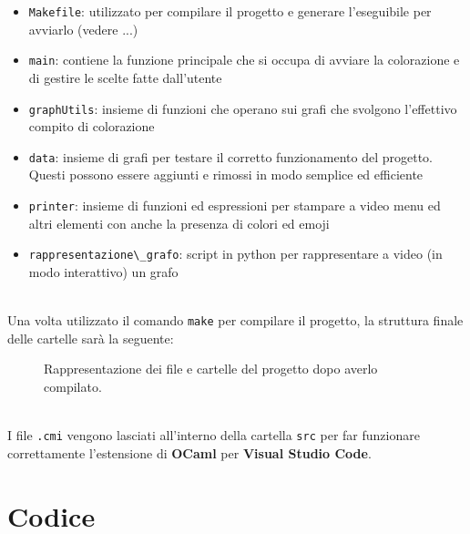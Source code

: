 \begin{itemize}
	\item \lstinline[style=cmd]|Makefile|: utilizzato per compilare il progetto e generare l'eseguibile per avviarlo (vedere ...)	%
	\item \lstinline[style=cmd]|main|: contiene la funzione principale che si occupa di avviare la colorazione e di gestire le scelte fatte dall'utente
	\item \lstinline[style=cmd]|graphUtils|: insieme di funzioni che operano sui grafi che svolgono l'effettivo compito di colorazione
	\item \lstinline[style=cmd]|data|: insieme di grafi per testare il corretto funzionamento del progetto. Questi possono essere aggiunti e rimossi in modo semplice ed efficiente
	\item \lstinline[style=cmd]|printer|: insieme di funzioni ed espressioni per stampare a video menu ed altri elementi con anche la presenza di colori ed emoji
	\item \lstinline[style=cmd]|rappresentazione\_grafo|: script in python per rappresentare a video (in modo interattivo) un grafo
\end{itemize}
\ \\
Una volta utilizzato il comando \lstinline[style=cmd]|make| per compilare il progetto, la struttura finale delle cartelle sarà la seguente:

\begin{figure}[H]
	\caption{Rappresentazione dei file e cartelle del progetto dopo averlo compilato.}
\end{figure}
\ \\
I file \lstinline[style=cmd]|.cmi| vengono lasciati all'interno della cartella \lstinline[style=cmd]|src| per far funzionare correttamente l'estensione di \textbf{OCaml} per \textbf{Visual Studio Code}. 
\section{Codice}
